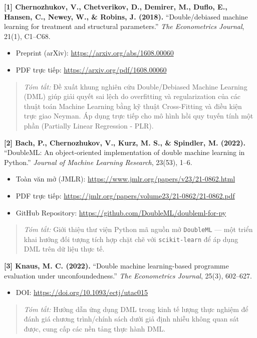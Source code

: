 \documentclass[12pt,a4paper]{article}
\begin{document}
\noindent\textbf{[1] Chernozhukov, V., Chetverikov, D., Demirer, M., Duflo, E., Hansen, C., Newey, W., \& Robins, J. (2018).} ``Double/debiased machine learning for treatment and structural parameters.'' \textit{The Econometrics Journal}, 21(1), C1--C68.
\begin{itemize}
    \item Preprint (arXiv): \url{https://arxiv.org/abs/1608.00060}
    \item PDF trực tiếp: \url{https://arxiv.org/pdf/1608.00060}
\end{itemize}
\begin{quote}
\textit{Tóm tắt:} Đề xuất khung nghiên cứu Double/Debiased Machine Learning (DML) giúp giải quyết sai lệch do overfitting và regularization của các thuật toán Machine Learning bằng kỹ thuật Cross-Fitting và điều kiện trực giao Neyman. Áp dụng trực tiếp cho mô hình hồi quy tuyến tính một phần (Partially Linear Regression - PLR).
\end{quote}

\noindent\textbf{[2] Bach, P., Chernozhukov, V., Kurz, M. S., \& Spindler, M. (2022).} ``DoubleML: An object-oriented implementation of double machine learning in Python.'' \textit{Journal of Machine Learning Research}, 23(53), 1--6.
\begin{itemize}
    \item Toàn văn mở (JMLR): \url{https://www.jmlr.org/papers/v23/21-0862.html}
    \item PDF trực tiếp: \url{https://jmlr.org/papers/volume23/21-0862/21-0862.pdf}
    \item GitHub Repository: \url{https://github.com/DoubleML/doubleml-for-py}
\end{itemize}
\begin{quote}
\textit{Tóm tắt:} Giới thiệu thư viện Python mã nguồn mở \texttt{DoubleML} --- một triển khai hướng đối tượng tích hợp chặt chẽ với \texttt{scikit-learn} để áp dụng DML trên dữ liệu thực tế.
\end{quote}

\noindent\textbf{[3] Knaus, M. C. (2022).} ``Double machine learning-based programme evaluation under unconfoundedness.'' \textit{The Econometrics Journal}, 25(3), 602--627.
\begin{itemize}
    \item DOI: \url{https://doi.org/10.1093/ectj/utac015}
\end{itemize}
\begin{quote}
\textit{Tóm tắt:} Hướng dẫn ứng dụng DML trong kinh tế lượng thực nghiệm để đánh giá chương trình/chính sách dưới giả định nhiễu không quan sát được, cung cấp các nền tảng thực hành DML.
\end{quote}
\end{document}
